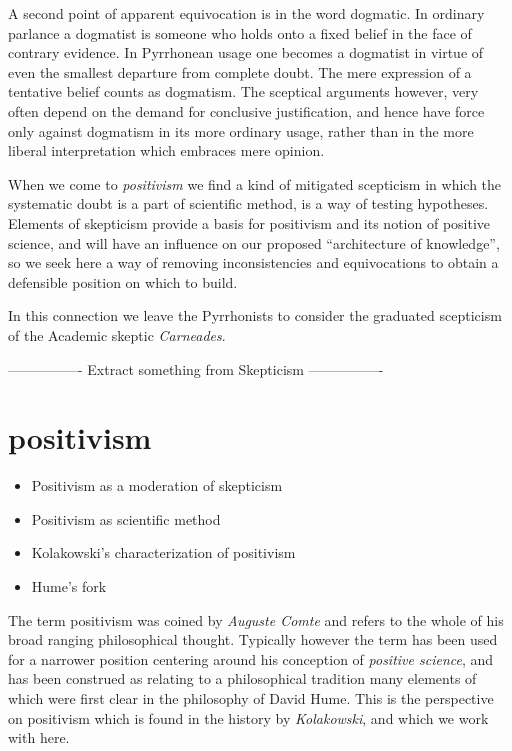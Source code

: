 A second point of apparent equivocation is in the word dogmatic.
In ordinary parlance a dogmatist is someone who holds onto a fixed belief in the face of contrary evidence.
In Pyrrhonean usage one becomes a dogmatist in virtue of even the smallest departure from complete doubt.
The mere expression of a tentative belief counts as dogmatism.
The sceptical arguments however, very often depend on the demand for conclusive justification, and hence have force only against dogmatism in its more ordinary usage, rather than in the more liberal interpretation which embraces mere opinion.

When we come to {\it positivism} we find a kind of mitigated scepticism in which the systematic doubt is a part of scientific method, is a way of testing hypotheses.
Elements of skepticism provide a basis for positivism and its notion of positive science, and will have an influence on our proposed ``architecture of knowledge'', so we seek here a way of removing inconsistencies and equivocations to obtain a defensible position on which to build.

In this connection we leave the Pyrrhonists to consider the graduated scepticism of the Academic skeptic {\it Carneades}.

---------------- Extract something from Skepticism ----------------


\section{positivism}

\begin{itemize}
\item Positivism as a moderation of skepticism
\item Positivism as scientific method
\item Kolakowski's characterization of positivism
\item Hume's fork
\end{itemize}

The term positivism was coined by \emph{Auguste Comte} and refers to the whole of his broad ranging philosophical thought.
Typically however the term has been used for a narrower position centering around his conception of \emph{positive science}, and has been construed as relating to a philosophical tradition many elements of which were first clear in the philosophy of David Hume.
This is the perspective on positivism which is found in the history by \emph{Kolakowski}\cite{kolakowskiPP}, and which we work with here.

